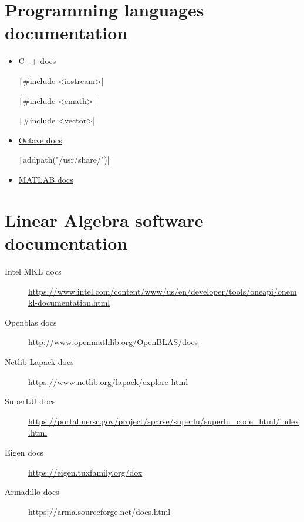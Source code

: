 \section{Programming languages documentation}

\begin{itemize}
	\item \href{https://en.cppreference.com}{C++ docs}

	      \texttt|#include <iostream>|

	      \texttt|#include <cmath>|

	      \texttt|#include <vector>|

	\item \href{https://docs.octave.org}{Octave docs}

	      \texttt|addpath("/usr/share/")|

	\item \href{https://www.mathworks.com/help/matlab/index.html}{MATLAB docs}
\end{itemize}

\section{Linear Algebra software documentation}

\begin{description}
	\item[Intel MKL docs]

	      \url{https://www.intel.com/content/www/us/en/developer/tools/oneapi/onemkl-documentation.html}

	\item[Openblas docs]

	      \url{http://www.openmathlib.org/OpenBLAS/docs}

	\item[Netlib Lapack docs]

	      \url{https://www.netlib.org/lapack/explore-html}

	\item[SuperLU docs]

	      \url{https://portal.nersc.gov/project/sparse/superlu/superlu_code_html/index.html}

	\item[Eigen docs]

	      \url{https://eigen.tuxfamily.org/dox}

	\item[Armadillo docs]
	      \url{https://arma.sourceforge.net/docs.html}
\end{description}

